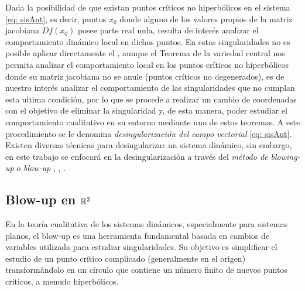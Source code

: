 Dada la posibilidad de que existan puntos críticos no hiperbólicos en el sistema \eqref{eq: sisAut}, es decir, puntos $x_{0}$ donde alguno de los valores propios de la matriz jacobiana $Df(x_0)$ posee parte real nula, resulta de interés analizar el comportamiento dinámico local en dichos puntos. En estas singularidades no es posible aplicar directamente el , aunque el Teorema de la variedad central nos permita analizar el comportamiento local en los puntos críticos no hiperbólicos donde su matriz jacobiana no se anule (puntos críticos no degenerados), es de nuestro interés analizar el comportamiento de las singularidades que no cumplan esta ultima condición, por lo que se procede a realizar un cambio de coordenadas con el objetivo de eliminar la singularidad y, de esta manera, poder estudiar el comportamiento cualitativo en su entorno mediante uno de estos teoremas. A este procedimiento se le denomina \textit{desingularización del campo vectorial} \eqref{eq: sisAut}. Existen diversas técnicas para desingularizar un sistema dinámico, sin embargo, en este trabajo se enfocará en la desingularización a través del \textit{método de blowing-up} o \textit{blow-up} \cite[p. 91]{Dumortier2006}, \cite[p. 362]{guckenheimer1983}, \cite[p. 64]{chicone2024}.

\subsection*{Blow-up en $ {\mathbb{R}}^2$}
En la teoría cualitativa de los sistemas dinámicos, especialmente para sistemas planos, el blow-up es una herramienta fundamental basada en cambios de variables utilizada para estudiar singularidades. Su objetivo es simplificar el estudio de un punto crítico complicado (generalmente en el origen) transformándolo en un círculo que contiene un número finito de nuevos puntos criticos, a menudo hiperbólicos. \\

